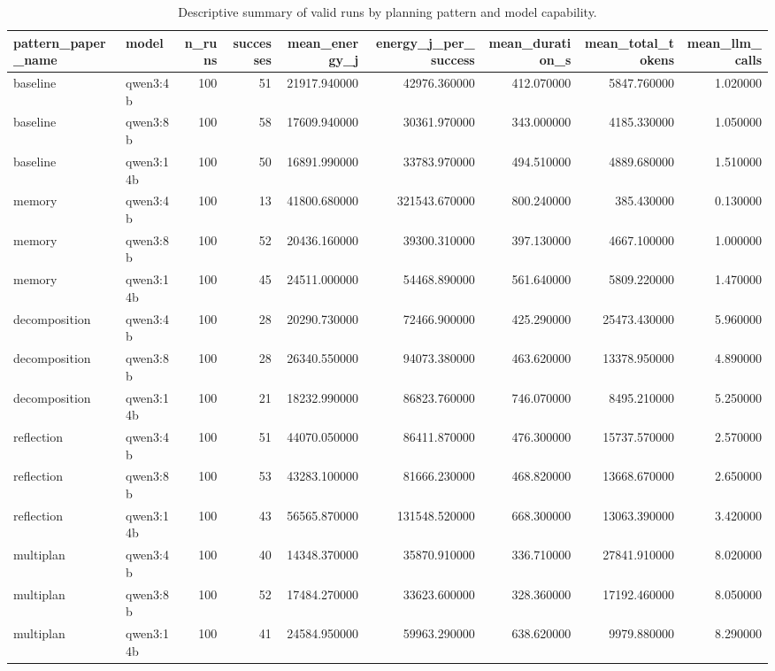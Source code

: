 \begin{table}
\caption{Descriptive summary of valid runs by planning pattern and model capability.}
\label{tab:descriptive-summary}
\begin{tabular}{llrrrrrrr}
\toprule
pattern\_paper\_name & model & n\_runs & successes & mean\_energy\_j & energy\_j\_per\_success & mean\_duration\_s & mean\_total\_tokens & mean\_llm\_calls \\
\midrule
baseline & qwen3:4b & 100 & 51 & 21917.940000 & 42976.360000 & 412.070000 & 5847.760000 & 1.020000 \\
baseline & qwen3:8b & 100 & 58 & 17609.940000 & 30361.970000 & 343.000000 & 4185.330000 & 1.050000 \\
baseline & qwen3:14b & 100 & 50 & 16891.990000 & 33783.970000 & 494.510000 & 4889.680000 & 1.510000 \\
memory & qwen3:4b & 100 & 13 & 41800.680000 & 321543.670000 & 800.240000 & 385.430000 & 0.130000 \\
memory & qwen3:8b & 100 & 52 & 20436.160000 & 39300.310000 & 397.130000 & 4667.100000 & 1.000000 \\
memory & qwen3:14b & 100 & 45 & 24511.000000 & 54468.890000 & 561.640000 & 5809.220000 & 1.470000 \\
decomposition & qwen3:4b & 100 & 28 & 20290.730000 & 72466.900000 & 425.290000 & 25473.430000 & 5.960000 \\
decomposition & qwen3:8b & 100 & 28 & 26340.550000 & 94073.380000 & 463.620000 & 13378.950000 & 4.890000 \\
decomposition & qwen3:14b & 100 & 21 & 18232.990000 & 86823.760000 & 746.070000 & 8495.210000 & 5.250000 \\
reflection & qwen3:4b & 100 & 51 & 44070.050000 & 86411.870000 & 476.300000 & 15737.570000 & 2.570000 \\
reflection & qwen3:8b & 100 & 53 & 43283.100000 & 81666.230000 & 468.820000 & 13668.670000 & 2.650000 \\
reflection & qwen3:14b & 100 & 43 & 56565.870000 & 131548.520000 & 668.300000 & 13063.390000 & 3.420000 \\
multiplan & qwen3:4b & 100 & 40 & 14348.370000 & 35870.910000 & 336.710000 & 27841.910000 & 8.020000 \\
multiplan & qwen3:8b & 100 & 52 & 17484.270000 & 33623.600000 & 328.360000 & 17192.460000 & 8.050000 \\
multiplan & qwen3:14b & 100 & 41 & 24584.950000 & 59963.290000 & 638.620000 & 9979.880000 & 8.290000 \\
\bottomrule
\end{tabular}
\end{table}
